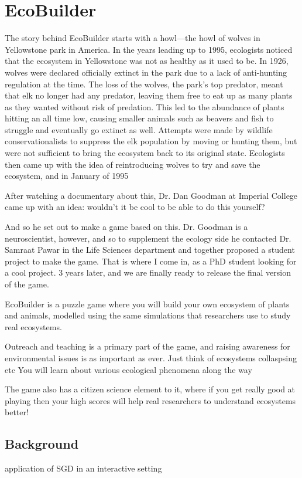 \chapter{EcoBuilder}

The story behind EcoBuilder starts with a howl---the howl of wolves in Yellowstone park in America. In the years leading up to 1995, ecologists noticed that the ecosystem in Yellowstone was not as healthy as it used to be. In 1926, wolves were declared officially extinct in the park due to a lack of anti-hunting regulation at the time. The loss of the wolves, the park's top predator, meant that elk no longer had any predator, leaving them free to eat up as many plants as they wanted without risk of predation. This led to the abundance of plants hitting an all time low, causing smaller animals such as beavers and fish to struggle and eventually go extinct as well.
Attempts were made by wildlife conservationalists to suppress the elk population by moving or hunting them, but were not sufficient to bring the ecosystem back to its original state. Ecologists then came up with the idea of reintroducing wolves to try and save the ecosystem, and in January of 1995 

After watching a documentary about this, Dr. Dan Goodman at Imperial College came up with an idea: wouldn't it be cool to be able to do this yourself? 

And so he set out to make a game based on this. Dr. Goodman is a neuroscientist, however, and so to supplement the ecology side he contacted Dr. Samraat Pawar in the Life Sciences department and together proposed a student project to make the game. That is where I come in, as a PhD student looking for a cool project. 3 years later, and we are finally ready to release the final version of the game.

EcoBuilder is a puzzle game where you will build your own ecosystem of plants and animals, modelled using the same simulations that researchers use to study real ecosystems. 

Outreach and teaching is a primary part of the game, and raising awareness for environmental issues is as important as ever. Just think of ecosystems collaspsing etc
You will learn about various ecological phenomena along the way

The game also has a citizen science element to it, where if you get really good at playing then your high scores will help real researchers to understand ecosystems better!

\section{Background}
application of SGD in an interactive setting

